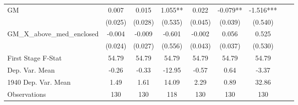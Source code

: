 \begin{tabular}{l*{8}{c}}
\cmidrule(lr){1-7}
GM              &    0.007   &    0.015   &    1.055** &    0.022   &   -0.079** &   -1.516***\\
                &  (0.025)   &  (0.028)   &  (0.535)   &  (0.045)   &  (0.039)   &  (0.540)   \\
\addlinespace
GM\_X\_above\_med\_enclosed&   -0.004   &   -0.009   &   -0.601   &   -0.002   &    0.056   &    0.525   \\
                &  (0.024)   &  (0.027)   &  (0.556)   &  (0.043)   &  (0.037)   &  (0.530)   \\
\midrule
First Stage F-Stat&    54.79   &    54.79   &    54.79   &    54.79   &    54.79   &    54.79   \\
Dep. Var. Mean  &    -0.26   &    -0.33   &   -12.95   &    -0.57   &     0.64   &    -3.37   \\
1940 Dep. Var. Mean&     1.49   &     1.61   &    14.09   &     2.29   &     0.89   &    32.86   \\
Observations    &      130   &      130   &      118   &      130   &      130   &      130   \\
 \bottomrule \end{tabular}
